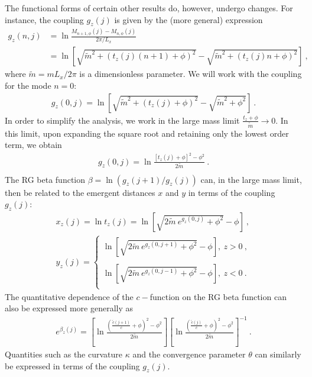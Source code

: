 The functional forms of certain other results do, however, undergo changes. For instance, the coupling \(g_z(j)\) is given by the (more general) expression
\begin{equation}\begin{aligned}
	g_z(n,j) &= \ln \frac{M_{n+1,\phi}(j) - M_{n,\phi}(j)}{2\pi/L_x} \\
	&= \ln \left[\sqrt{\tilde m^2 + \left(t_z(j)(n+1) + \phi\right)^2} -\sqrt{\tilde m^2 + \left(t_z(j)n + \phi\right)^2} \right]~, 
\end{aligned}\end{equation}
where \(\tilde m = m L_x/2\pi\) is a dimensionless parameter. We will work with the coupling for the mode \(n=0\):
\begin{equation}\begin{aligned}
	g_z(0,j) = \ln \left[\sqrt{\tilde m^2 + \left(t_z(j) + \phi\right)^2} -\sqrt{\tilde m^2 + \phi^2} \right]~. 
\end{aligned}\end{equation}
In order to simplify the analysis, we work in the large mass limit \(\frac{t_z + \phi}{\tilde m} \to 0\).
In this limit, upon expanding the square root and retaining only the lowest order term, we obtain
\begin{equation}\begin{aligned}
g_z(0,j) = \ln \frac{\left[t_z(j) + \phi\right] ^2 - \phi^2}{2\tilde m}~.\\
\end{aligned}\end{equation}
The RG beta function $\beta = \ln (g_{z}(j+1)/g_{z}(j))$ can, in the large mass limit, then be related to the emergent distances \(x\) and \(y\) in terms of the coupling \(g_z(j)\):
\begin{gather}
	x_z(j) = \ln t_{z}(j) = \ln \left[\sqrt{2\tilde m~ e^{g_{z}(0,j)} + \phi^2} - \phi\right]~, \\
	y_z(j) = \begin{cases}
		\ln \left[\sqrt{2\tilde m~ e^{g_{z}(0,j+1)} + \phi^2} - \phi\right],~ z > 0~, \\
		\\
		\ln \left[\sqrt{2\tilde m~ e^{g_{z}(0,j-1)} + \phi^2} - \phi\right],~ z < 0 ~.\\
	\end{cases}
\end{gather}
The quantitative dependence of the \(c-\)function on the RG beta function can also be expressed more generally as
\begin{equation}\begin{aligned}
	e^{\beta_z(j)} = \left[\ln \frac{\left(\frac{\tilde c(j+1)}{c} + \phi\right) ^2 - \phi^2}{2\tilde m}\right] \left[\ln \frac{\left(\frac{\tilde c(j)}{c} + \phi\right) ^2 - \phi^2}{2\tilde m}\right]^{-1}~.
\end{aligned}\end{equation}
Quantities such as the curvature $\kappa$ and the convergence parameter $\theta$ can similarly be expressed in terms of the coupling \(g_z(j)\).

